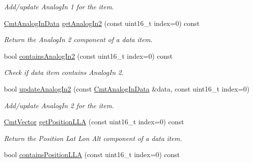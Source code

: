 \begin{DoxyCompactItemize}
\begin{DoxyCompactList}\small\item\em \-Add/update \-Analog\-In 1 for the item. \end{DoxyCompactList}\item 
\hyperlink{structCmtAnalogInData}{\-Cmt\-Analog\-In\-Data} \hyperlink{classxsens_1_1Packet_aa9d558dc7ea81afc874423cb7bd3bf7a}{get\-Analog\-In2} (const uint16\-\_\-t index=0) const 
\begin{DoxyCompactList}\small\item\em \-Return the \-Analog\-In 2 component of a data item. \end{DoxyCompactList}\item 
\hypertarget{classxsens_1_1Packet_a47bb3a8c0ce56b68cb3d70b010d02126}{bool \hyperlink{classxsens_1_1Packet_a47bb3a8c0ce56b68cb3d70b010d02126}{contains\-Analog\-In2} (const uint16\-\_\-t index=0) const }\label{classxsens_1_1Packet_a47bb3a8c0ce56b68cb3d70b010d02126}

\begin{DoxyCompactList}\small\item\em \-Check if data item contains \-Analog\-In 2. \end{DoxyCompactList}\item 
\hypertarget{classxsens_1_1Packet_a1a1c170373ea8b100d4d04763269e1e4}{bool \hyperlink{classxsens_1_1Packet_a1a1c170373ea8b100d4d04763269e1e4}{update\-Analog\-In2} (const \hyperlink{structCmtAnalogInData}{\-Cmt\-Analog\-In\-Data} \&data, const uint16\-\_\-t index=0)}\label{classxsens_1_1Packet_a1a1c170373ea8b100d4d04763269e1e4}

\begin{DoxyCompactList}\small\item\em \-Add/update \-Analog\-In 2 for the item. \end{DoxyCompactList}\item 
\hyperlink{structCmtVector}{\-Cmt\-Vector} \hyperlink{classxsens_1_1Packet_a08812bb7b59c1de4270564e60e6e1a68}{get\-Position\-L\-L\-A} (const uint16\-\_\-t index=0) const 
\begin{DoxyCompactList}\small\item\em \-Return the \-Position \-Lat \-Lon \-Alt component of a data item. \end{DoxyCompactList}\item 
\hypertarget{classxsens_1_1Packet_ab0b842017c0e0c006b55e08d4fd1dea6}{bool \hyperlink{classxsens_1_1Packet_ab0b842017c0e0c006b55e08d4fd1dea6}{contains\-Position\-L\-L\-A} (const uint16\-\_\-t index=0) const }\label{classxsens_1_1Packet_ab0b842017c0e0c006b55e08d4fd1dea6}


\end{DoxyCompactItemize}
